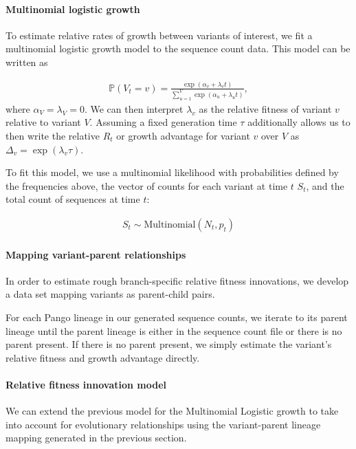 \documentclass[12pt,oneside,letterpaper]{article}
\begin{document}
\paragraph{Multinomial logistic growth}

To estimate relative rates of growth between variants of interest, we fit a multinomial logistic growth model to the sequence count data.
This model can be written as

\begin{align*}
    \mathbb{P}(V_{t} = v) = \frac{\exp(\alpha_{v} + \lambda_{v} t)}{\sum_{u=1}^{V} \exp(\alpha_{u} + \lambda_{u} t)},
\end{align*}
where $\alpha_{V} = \lambda_{V} = 0$.
We can then interpret $\lambda_{v}$ as the relative fitness of variant $v$ relative to variant $V$.
Assuming a fixed generation time $\tau$ additionally allows us to then write the relative $R_{t}$ or growth advantage for variant $v$ over $V$ as $\Delta_{v} = \exp(\lambda_{v}\tau)$.

To fit this model, we use a multinomial likelihood with probabilities defined by the frequencies above, the vector of counts for each variant at time $t$ $S_{t}$, and the total count of sequences at time $t$:

\begin{align*}
    S_{t} \sim \text{Multinomial}(N_{t}, p_{t})
\end{align*}

\paragraph{Mapping variant-parent relationships}%

In order to estimate rough branch-specific relative fitness innovations, we develop a data set mapping variants as parent-child pairs.

For each Pango lineage in our generated sequence counts, we iterate to its parent lineage until the parent lineage is either in the sequence count file or there is no parent present.
If there is no parent present, we simply estimate the variant's relative fitness and growth advantage directly.

\paragraph{Relative fitness innovation model}%

We can extend the previous model for the Multinomial Logistic growth to take into account for evolutionary relationships using the variant-parent lineage mapping generated in the previous section.
\end{document}
